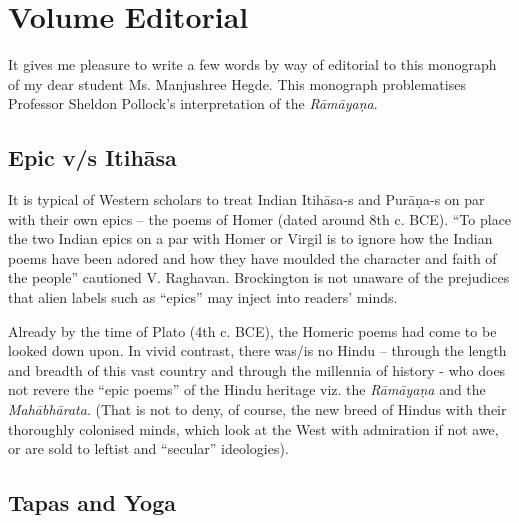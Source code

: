 \chapter*{Volume Editorial}\label{volume_editorial}



It gives me pleasure to write a few words by way of editorial to this monograph of my dear student Ms. Manjushree Hegde. This monograph problematises Professor Sheldon Pollock's interpretation of the {\sl Rāmāyaṇa}.

\section*{Epic v/s Itihāsa}

It is typical of Western scholars to treat Indian Itihāsa-s and Purāṇa-s on par with their own epics -- the poems of Homer (dated around 8th c. BCE). ``To place the two Indian epics on a par with Homer or Virgil is to ignore how the Indian poems have been adored and how they have moulded the character and faith of the people'' cautioned V. Raghavan. Brockington is not unaware of the prejudices that alien labels such as ``epics'' may inject into readers' minds. 
 
Already by the time of Plato (4th c. BCE), the Homeric poems had come to be looked down upon. In vivid contrast, there was/is no Hindu -- through  the length and breadth of this vast country and through the millennia of history - who does not revere the ``epic poems'' of the Hindu heritage viz. the {\sl Rāmāyaṇa} and the {\sl Mahābhārata}. (That is not to deny, of course, the new breed of Hindus with their thoroughly colonised minds, which look at the West with admiration if not awe, or are sold to leftist and ``secular'' ideologies).

\section*{Tapas and Yoga}

